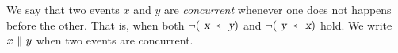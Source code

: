 \documentclass[acmlarge,review,anonymous]{acmart}\settopmatter{printfolios=true}
\begin{document}
We say that two events $x$ and $y$ are \emph{concurrent} whenever one does not happens before the other.
That is, when both $\neg (\isa{x} \prec \isa{y})$ and $\neg (\isa{y} \prec \isa{x})$ hold.
We write $x\ {\isasymparallel}\ y$ when two events are concurrent.
\end{document}
